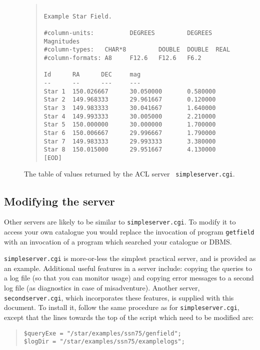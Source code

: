 \documentclass[twoside,11pt]{article}
\renewcommand{\_}{\texttt{\symbol{95}}}
\begin{document}
\begin{figure}[htbp]

\begin{quote}
\begin{verbatim}

Example Star Field.

#column-units:          DEGREES         DEGREES         Magnitudes
#column-types:   CHAR*8         DOUBLE  DOUBLE  REAL
#column-formats: A8     F12.6   F12.6   F6.2

Id      RA      DEC     mag
--      --      ---     ---
Star 1  150.026667      30.050000       0.580000
Star 2  149.968333      29.961667       0.120000
Star 3  149.983333      30.041667       1.640000
Star 4  149.993333      30.005000       2.210000
Star 5  150.000000      30.000000       1.700000
Star 6  150.006667      29.996667       1.790000
Star 7  149.983333      29.993333       3.380000
Star 8  150.015000      29.951667       4.130000
[EOD]
\end{verbatim}

\caption{The table of values returned by the ACL server {\tt
simpleserver.cgi}.
\label{SIMPLE_TST} }
\end{quote}

\end{figure}


\subsection{Modifying the server}

Other servers are likely to be similar to {\tt simpleserver.cgi}.  To
modify it to access your own catalogue you would replace the invocation
of program {\tt getfield} with an invocation of a program which searched
your catalogue or DBMS.

{\tt simpleserver.cgi} is more-or-less the simplest practical server,
and is provided as an example.  Additional useful features in a server
include: copying the queries to a log file (so that you can monitor
usage) and copying error messages to a second log file (as diagnostics
in case of misadventure).  Another server, {\tt secondserver.cgi}, which
incorporates these features, is supplied with this document.  To install
it, follow the same procedure as for {\tt simpleserver.cgi}, except that
the lines towards the top of the script which need to be modified are:

  \begin{quote}
    \verb+$queryExe = "/star/examples/ssn75/genfield";+ \\
    \verb+$logDir = "/star/examples/ssn75/examplelogs";+
  \end{quote}
\end{document}
